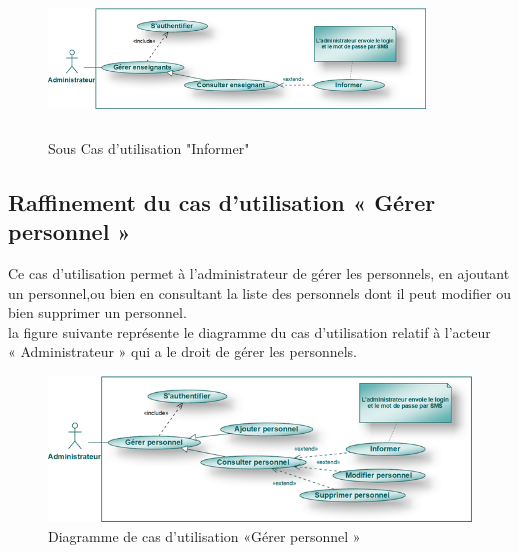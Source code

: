 \documentclass[12 pt ]{report}
\begin{document}
\begin{figure}[h]
\begin{center}
\includegraphics[width= 10cm , height =4cm]{informer_ens.png}
\caption{Sous Cas d'utilisation "Informer"}
\end{center}
\end{figure}
\subsection{Raffinement du cas d’utilisation « Gérer personnel »}
Ce cas d’utilisation permet à l’administrateur de gérer les personnels, en ajoutant
un personnel,ou bien en consultant la liste des personnels dont il peut modifier ou
bien supprimer un personnel.\\
la figure suivante représente le diagramme du cas d’utilisation  relatif à l’acteur \\« Administrateur » qui a le droit de gérer les personnels.
 \begin{figure}[h]
\includegraphics[width= 15 cm ,height= 6 cm]{admin1.png}
\caption{ Diagramme de cas d'utilisation  «Gérer personnel »}
\end{figure}
\end{document}

